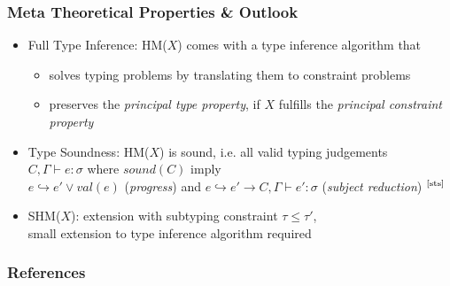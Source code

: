\documentclass[aspectratio=169]{beamer}
\begin{document}
\begingroup
\large
\begin{frame}[fragile]
  \frametitle{Meta Theoretical Properties \& Outlook}
  \begin{itemize}
    \item Full Type Inference: HM($X$) comes with a type inference algorithm
          that
          \begin{itemize}
            \item solves typing problems by translating them to constraint
                  problems
            \item preserves the \emph{principal type property}, if $X$ fulfills
                  the \emph{principal constraint property}
          \end{itemize}
    \item Type Soundness: HM($X$) is sound, i.e. all valid typing judgements
          \\ \quad $C, Γ ⊢ e : σ$ where $sound(C)$ imply \\
          \quad $e ↪ e′ ∨ val(e)$ (\emph{progress}) and
          $e ↪ e′ → C, Γ ⊢ e′ : σ$ (\emph{subject reduction})
          $^{\text{\cite{sts}}}$
    \item SHM($X$): extension with subtyping constraint $τ ≤ τ′$, \\
          \quad small extension to type inference algorithm required
  \end{itemize}
\end{frame}
\endgroup

\begin{frame}[fragile]
  \frametitle{References}
  \nocite{atapl}
  \printbibliography
\end{frame}
\end{document}
